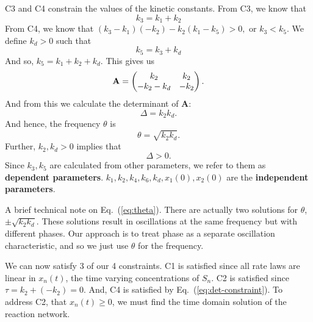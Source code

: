 \documentclass{bmcart}
\newcommand{\eqn}[1]{Eq.~(\ref{#1})}
\begin{document}
C3 and C4 constrain the values of the kinetic constants.
From C3, we know that 
\begin{equation}
k_3 = k_1 + k_2
\label{eq:k3}
\end{equation}
From C4, we know that $(k_3 - k_1)(-k_2) - k_2(k_1 - k_5) > 0,$ or $k_3 < k_5.$
We define $k_d >0$ such that
\begin{equation}
k_5  = k_3 + k_d 
\label{eq:k5}
\end{equation}
And so, $k_5 = k_1 + k_2 + k_d$.
This gives us
\begin{equation}
{\bf A} = \left( \begin{matrix}
     k_2 & k_2  \\
     -k_2 -k_d & -k_2
\end{matrix} \right). \label{eq:Amatrix}
\end{equation}
And from this we calculate the determinant of {\bf A}:
\begin{equation}
    \Delta  = k_2 k_d \label{eq:det} .
\end{equation}
And hence, the frequency $\theta$ is
\begin{equation}
\theta = \sqrt{k_2 k_d} .
\label{eq:theta}
\end{equation}
Further, $k_2, k_d > 0$ implies that
\begin{equation}
    \Delta  >  0. \label{eq:det-constraint}
\end{equation}
Since $k_3, k_5$ are calculated from other parameters, we refer to them as {\bf dependent parameters}. $k_1, k_2, k_4, k_6, k_d, x_1 (0), x_2 (0)$ are the {\bf independent parameters}.


A brief technical note on \eqn{eq:theta}. There are actually two solutions for $\theta$, 
$\pm \sqrt{k_2 k_d}$. These solutions result in oscillations at the same frequency but with different phases. Our approach is to treat phase as a separate oscillation characteristic, and so we just use $\theta$ for the frequency.

We can now satisfy 3 of our 4 constraints. C1 is satisfied since all rate laws are linear in $x_n (t)$, the time varying concentrations of $S_n$. C2 is satisfied since $\tau = k_2 + (- k_2) = 0.$ And, C4 is satisfied by \eqn{eq:det-constraint}. To address C2, that $x_n(t) \geq 0$, we must find the time domain solution of the reaction network.
\end{document}
